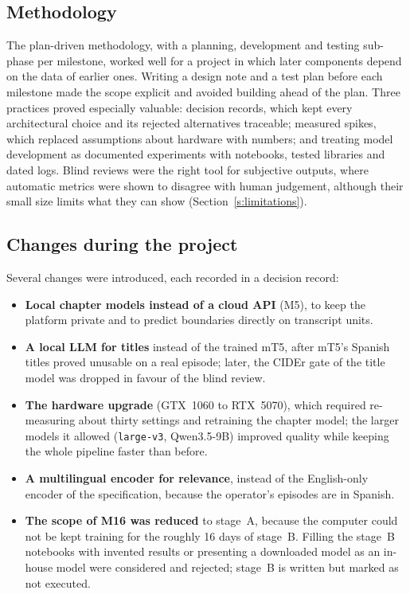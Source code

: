 \subsection*{Methodology}

The plan-driven methodology, with a planning, development and testing sub-phase per milestone, worked well for a project in which later components depend on the data of earlier ones. Writing a design note and a test plan before each milestone made the scope explicit and avoided building ahead of the plan. Three practices proved especially valuable: decision records, which kept every architectural choice and its rejected alternatives traceable; measured spikes, which replaced assumptions about hardware with numbers; and treating model development as documented experiments with notebooks, tested libraries and dated logs. Blind reviews were the right tool for subjective outputs, where automatic metrics were shown to disagree with human judgement, although their small size limits what they can show (Section~\ref{s:limitations}).

\subsection*{Changes during the project}

Several changes were introduced, each recorded in a decision record:
\begin{itemize}
\item \textbf{Local chapter models instead of a cloud API} (M5), to keep the platform private and to predict boundaries directly on transcript units.
\item \textbf{A local LLM for titles} instead of the trained mT5, after mT5's Spanish titles proved unusable on a real episode; later, the CIDEr gate of the title model was dropped in favour of the blind review.
\item \textbf{The hardware upgrade} (GTX~1060 to RTX~5070), which required re-measuring about thirty settings and retraining the chapter model; the larger models it allowed (\texttt{large-v3}, Qwen3.5-9B) improved quality while keeping the whole pipeline faster than before.
\item \textbf{A multilingual encoder for relevance}, instead of the English-only encoder of the specification, because the operator's episodes are in Spanish.
\item \textbf{The scope of M16 was reduced} to stage~A, because the computer could not be kept training for the roughly 16 days of stage~B. Filling the stage~B notebooks with invented results or presenting a downloaded model as an in-house model were considered and rejected; stage~B is written but marked as not executed.
\end{itemize}

